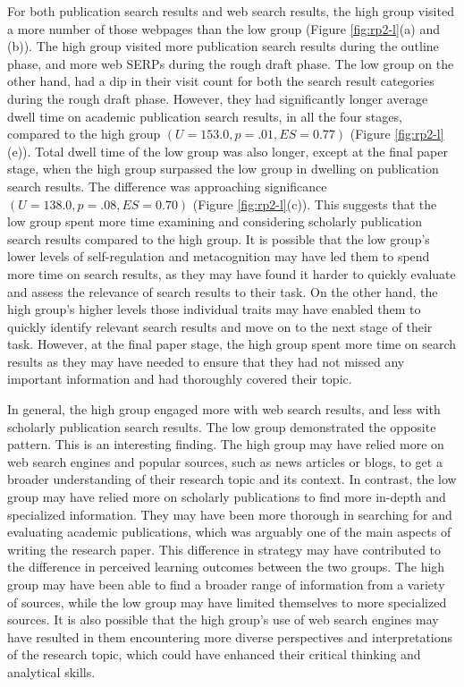 \documentclass[letterpaper, nobind]{templates/ociamthesis}
\begin{document}
For both publication search results and web search results, the high group visited a more number of those webpages than the low group (Figure \ref{fig:rp2-l}(a) and (b)).
The high group visited more publication search results during the outline phase, and more web SERPs during the rough draft phase.
The low group on the other hand, had a dip in their visit count for both the search result categories during the rough draft phase.
However, they had significantly longer average dwell time on academic publication search results, in all the four stages, compared to the high group \((U = 153.0, p = .01, ES = 0.77)\) (Figure \ref{fig:rp2-l}(e)).
Total dwell time of the low group was also longer, except at the final paper stage, when the high group surpassed the low group in dwelling on publication search results.
The difference was approaching significance \((U = 138.0, p = .08, ES = 0.70)\) (Figure \ref{fig:rp2-l}(c)).
This suggests that the low group spent more time examining and considering scholarly publication search results compared to the high group.
It is possible that the low group's lower levels of self-regulation and metacognition may have led them to spend more time on search results, as they may have found it harder to quickly evaluate and assess the relevance of search results to their task.
On the other hand, the high group's higher levels those individual traits may have enabled them to quickly identify relevant search results and move on to the next stage of their task.
However, at the final paper stage, the high group spent more time on search results as they may have needed to ensure that they had not missed any important information and had thoroughly covered their topic.

In general, the high group engaged more with web search results, and less with scholarly publication search results.
The low group demonstrated the opposite pattern.
This is an interesting finding.
The high group may have relied more on web search engines and popular sources, such as news articles or blogs, to get a broader understanding of their research topic and its context.
In contrast, the low group may have relied more on scholarly publications to find more in-depth and specialized information.
They may have been more thorough in searching for and evaluating academic publications, which was arguably one of the main aspects of writing the research paper.
This difference in strategy may have contributed to the difference in perceived learning outcomes between the two groups.
The high group may have been able to find a broader range of information from a variety of sources, while the low group may have limited themselves to more specialized sources.
It is also possible that the high group's use of web search engines may have resulted in them encountering more diverse perspectives and interpretations of the research topic, which could have enhanced their critical thinking and analytical skills.
\end{document}
